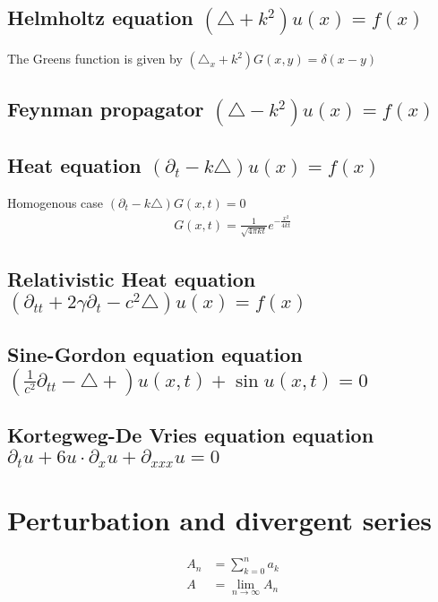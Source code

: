 \documentclass[../main.tex]{subfiles}
\begin{document}
\newpage
\subsection{Helmholtz equation \texorpdfstring{$(\triangle +k^2)u(x)= f(x)$}{TEXT}}
The Greens function is given by $(\triangle_x +k^2)G(x,y)=\delta(x-y)$

\subsection{Feynman propagator \texorpdfstring{$\left(\triangle-k^2\right) u(x)= f(x)$}{TEXT}}

\subsection{Heat equation \texorpdfstring{$\left(\partial_{t}-k\triangle\right) u(x)= f(x)$}{TEXT}}

Homogenous case $\left(\partial_{t}-k\triangle\right) G(x,t)=0$
\begin{align}
G(x,t)=\frac{1}{\sqrt{4\pi kt}}e^{-\frac{x^2}{4kt}}
\end{align}



\subsection{Relativistic Heat equation \texorpdfstring{$\left(\partial_{tt}+2\gamma\partial_t-c^2\triangle\right) u(x)= f(x)$}{TEXT}}

\subsection{Sine-Gordon equation equation \texorpdfstring{$\left(\frac{1}{c^2}\partial_{tt}-\triangle+\right) u(x,t)+\sin u(x,t)=0$}{TEXT}}

\subsection{Kortegweg-De Vries equation equation \texorpdfstring{$\partial_tu+6u\cdot\partial_x u+\partial_{xxx}u= 0$}{TEXT}}

\newpage
\section{Perturbation and divergent series}
\begin{align}
A_n&=\sum_{k=0}^{n}a_k\\
A&=\lim_{n\rightarrow\infty}A_n
\end{align}
\end{document}
